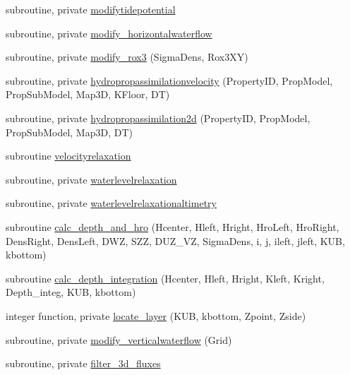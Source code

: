 \begin{DoxyCompactItemize}
\item 
subroutine, private \mbox{\hyperlink{namespacemodulehydrodynamic_af96ad695325003d3a6068df53933c723}{modifytidepotential}}
\item 
subroutine, private \mbox{\hyperlink{namespacemodulehydrodynamic_a90cfb4d3462f345fb4c6da09ace1521d}{modify\+\_\+horizontalwaterflow}}
\item 
subroutine, private \mbox{\hyperlink{namespacemodulehydrodynamic_a9f3d6185fb652a067c6f42b46723a9cc}{modify\+\_\+rox3}} (Sigma\+Dens, Rox3\+XY)
\item 
subroutine, private \mbox{\hyperlink{namespacemodulehydrodynamic_a1979e519c233cd0af0ad00eab566a414}{hydropropassimilationvelocity}} (Property\+ID, Prop\+Model, Prop\+Sub\+Model, Map3D, K\+Floor, DT)
\item 
subroutine, private \mbox{\hyperlink{namespacemodulehydrodynamic_a310b0813e62bd6d4cb63d9e4acbf299d}{hydropropassimilation2d}} (Property\+ID, Prop\+Model, Prop\+Sub\+Model, Map3D, DT)
\item 
subroutine \mbox{\hyperlink{namespacemodulehydrodynamic_a3011a9be54d29dbb8d387a2253b36ab3}{velocityrelaxation}}
\item 
subroutine, private \mbox{\hyperlink{namespacemodulehydrodynamic_af6e5fcf3d54f676a11ab22c650353cef}{waterlevelrelaxation}}
\item 
subroutine, private \mbox{\hyperlink{namespacemodulehydrodynamic_aaf7d95cf12308ea359a620a3f357b5c5}{waterlevelrelaxationaltimetry}}
\item 
subroutine \mbox{\hyperlink{namespacemodulehydrodynamic_a3795523d3d6ec72b6a33735c32624ff2}{calc\+\_\+depth\+\_\+and\+\_\+hro}} (Hcenter, Hleft, Hright, Hro\+Left, Hro\+Right, Dens\+Right, Dens\+Left, D\+WZ, S\+ZZ, D\+U\+Z\+\_\+\+VZ, Sigma\+Dens, i, j, ileft, jleft, K\+UB, kbottom)
\item 
subroutine \mbox{\hyperlink{namespacemodulehydrodynamic_a6026ae01a3e1aa6a649387589a05431c}{calc\+\_\+depth\+\_\+integration}} (Hcenter, Hleft, Hright, Kleft, Kright, Depth\+\_\+integ, K\+UB, kbottom)
\item 
integer function, private \mbox{\hyperlink{namespacemodulehydrodynamic_a24a4da561094133e0ef8f2a5d350d8ac}{locate\+\_\+layer}} (K\+UB, kbottom, Zpoint, Zside)
\item 
subroutine, private \mbox{\hyperlink{namespacemodulehydrodynamic_a46041cae58ee2c4998a230bec6a29842}{modify\+\_\+verticalwaterflow}} (Grid)
\item 
subroutine, private \mbox{\hyperlink{namespacemodulehydrodynamic_a9de56e052f0a5f85cbbcbac9a2f0f95a}{filter\+\_\+3d\+\_\+fluxes}}

\end{DoxyCompactItemize}
